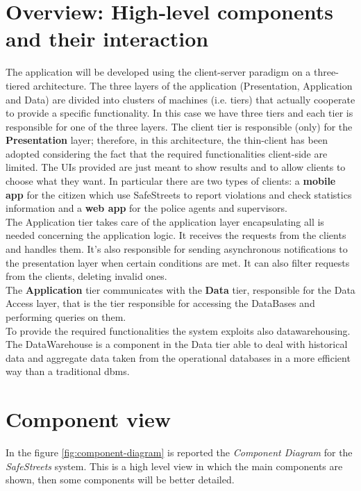 \documentclass[a4paper]{report}
\begin{document}
\section{Overview: High­‐level components and their interaction}
The application will be developed using the client-server paradigm on a three-tiered architecture. The three layers of the application (Presentation, Application and Data) are divided into clusters of machines (i.e. tiers) that actually cooperate to provide a specific functionality. In this case we have three tiers  and each tier is responsible for one of the three layers. The client tier is responsible (only) for the \textbf{Presentation} layer; therefore, in this architecture, the thin-client has been adopted considering the fact that the required functionalities client-side are limited. The UIs provided are just meant to show results and to allow clients to choose what they want. In particular there are two types of clients: a \textbf{mobile app} for the citizen which use SafeStreets to report violations and check statistics information and a \textbf{web app} for the police agents and supervisors. \\
The Application tier takes care of the application layer encapsulating all is needed concerning the application logic. It receives the requests from the clients and handles them. It's also responsible for sending asynchronous notifications to the presentation layer when certain conditions are met. It can also filter requests from the clients, deleting invalid ones.\\
The \textbf{Application} tier communicates with the \textbf{Data} tier, responsible for the Data Access layer, that is the tier responsible for accessing the DataBases and performing queries on them.\\
To provide the required functionalities the system exploits also datawarehousing. The DataWarehouse is a component in the Data tier able to deal with historical data and aggregate data taken from the operational databases in a more efficient way than a traditional dbms.
\section{Component view}
In the figure \ref{fig:component-diagram} is reported the \textit{Component Diagram} for the \textit{SafeStreets} system. This is a high level view in which the main components are shown, then some components will be better detailed.
\end{document}

